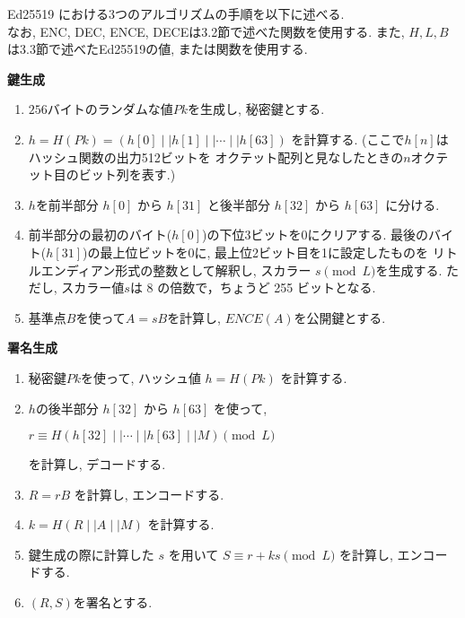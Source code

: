 Ed25519 における3つのアルゴリズムの手順を以下に述べる.\\
\indent なお, ENC, DEC, ENCE, DECEは3.2節で述べた関数を使用する.
また, $H, L, B$は3.3節で述べたEd25519の値, または関数を使用する.\\[1em]
\let\ltxlist\list
\begin{breakitembox}[l]{\textbf{鍵生成}}
  　
  \begin{enumerate}[parsep=7pt]
    \item $256$バイトのランダムな値$Pk$を生成し, 秘密鍵とする.
    \item $h=H(Pk)=(h[0]\mid\mid h[1]\mid\mid \cdots\mid\mid h[63])$
    を計算する. (ここで$h[n]$はハッシュ関数の出力512ビットを
    オクテット配列と見なしたときの$n$オクテット目のビット列を表す.)
    \item $h$を前半部分 $h[0]$ から $h[31]$ と後半部分 $h[32]$ から $h[63]$ に分ける.
    \item 前半部分の最初のバイト($h[0]$)の下位3ビットを0にクリアする.
    最後のバイト($h[31]$)の最上位ビットを0に, 最上位2ビット目を1に設定したものを
    リトルエンディアン形式の整数として解釈し, スカラー $s \pmod L$を生成する. 
    ただし, スカラー値$s$は 8 の倍数で，ちょうど 255 ビットとなる.
    \item 基準点$B$を使って$A = sB$を計算し, $ENCE(A)$を公開鍵とする. 
  \end{enumerate}
\end{breakitembox}
\vspace{2em}
\let\ltxlist\list
\begin{breakitembox}[l]{\textbf{署名生成}}
  　
  \begin{enumerate}[parsep=7pt]
    \item 秘密鍵$Pk$を使って, ハッシュ値 $h=H(Pk)$ を計算する.
    \item $h$の後半部分 $h[32]$ から $h[63]$ を使って, 
    \begin{center}
      $r \equiv H(h[32]\mid\mid \cdots \mid\mid h[63] \mid\mid M) \pmod L$
    \end{center}
    を計算し, デコードする.
    \item $R=rB$ を計算し, エンコードする.
    \item $k=H(R \mid\mid A \mid\mid M)$ を計算する.
    \item 鍵生成の際に計算した $s$ を用いて $S\equiv r+ks \pmod L$ を計算し, エンコードする.
    \item $(R,S)$を署名とする.
  \end{enumerate}
\end{breakitembox}
